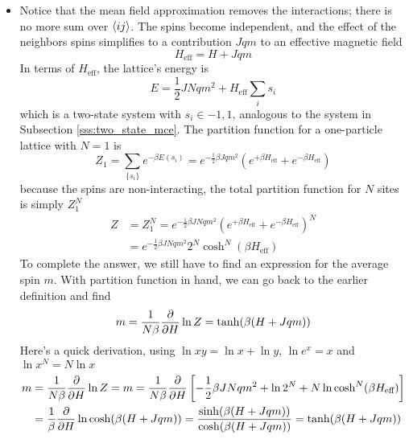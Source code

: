 \documentclass[11pt, a4paper]{article}
\newcommand{\heff}{H_{\text{eff}}}
\begin{document}
\begin{itemize}
	\item Notice that the mean field approximation removes the interactions; there is no more sum over $ \expval{i j} $. The spins become independent, and the effect of the neighbors spins simplifies to a contribution $ Jqm $ to an effective magnetic field
	\begin{equation*}
		\heff = H + Jqm
	\end{equation*}
	In terms of $ \heff $, the lattice's energy is 
	\begin{equation*}
		E = \frac{1}{2}JNqm^{2} + \heff \sum_{i}s_{i}
	\end{equation*}
	which is a two-state system with $ s_{i} \in {-1, 1} $, analogous to the system in Subsection \ref{sss:two_state_mce}. The partition function for a one-particle lattice with $ N = 1 $ is
	\begin{equation*}
		Z_{1} = \sum_{\{s_{i}\}} e^{-\beta E(s_{i})} = e^{-\frac{1}{2}\beta Jqm^{2}} \left(e^{+\beta \heff } + e^{-\beta \heff} \right)
	\end{equation*}
	because the spins are non-interacting, the total partition function for $ N $ sites is simply $ Z_{1}^{N} $
	\begin{align*}
		Z &= Z_{1}^{N} = e^{-\frac{1}{2}\beta JNqm^{2}} \left(e^{+\beta \heff } + e^{-\beta \heff} \right)^{N}\\
		&=e^{-\frac{1}{2}\beta JNqm^{2}}2^{N} \cosh^{N}(\beta \heff)
	\end{align*}
	To complete the answer, we still have to find an expression for the average spin $ m $. With partition function in hand, we can go back to the earlier definition and find
	\begin{equation*}
		m = \frac{1}{N \beta }\pdv{}{H} \ln Z = \tanh(\beta(H + Jqm))
	\end{equation*}
	Here's a quick derivation, using $ \ln xy = \ln x + \ln y $, $ \ln e^{x} = x $ and $ \ln x^{N} = N \ln x $
	\begin{align*}
		m &= \frac{1}{N \beta }\pdv{}{H} \ln Z = m = \frac{1}{N \beta }\pdv{}{H}\left[-\frac{1}{2}\beta JNqm^{2} + \ln 2^{N} + N \ln \cosh^{N}(\beta \heff) \right]\\
		&= \frac{1}{\beta }\pdv{}{H} \ln \cosh(\beta(H + Jqm)) = \frac{\sinh(\beta(H + Jqm))}{\cosh(\beta(H + Jqm))} = \tanh(\beta(H + Jqm))
	\end{align*}
\end{itemize}	
\end{document}
